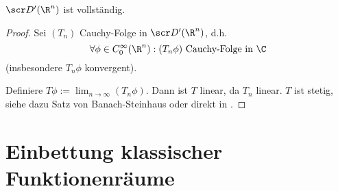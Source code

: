 \begin{st} \label{5.6}
	$\scr D'(\R^n)$ ist vollständig.
	\begin{proof}
		Sei $(T_n)$ Cauchy-Folge in $\scr D'(\R^n)$, d.h.
		\[
			\forall \phi \in C_0^\infty(\R^n) : (T_n \phi) \text{ Cauchy-Folge in $\C$}
		\]
		(insbesondere $T_n \phi$ konvergent).

		Definiere $T\phi := \lim_{n\to \infty} (T_n \phi)$.
		Dann ist $T$ linear, da $T_n$ linear.
		$T$ ist stetig, siehe dazu Satz von Banach-Steinhaus oder direkt in \cite{walter94}.
	\end{proof}
\end{st}

\section{Einbettung klassischer Funktionenräume}


